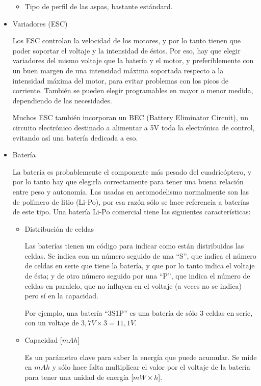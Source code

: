 \documentclass[12pt,twoside]{article}
\begin{document}
\begin{itemize}
\begin{itemize}
			\item  Tipo de perfil de las aspas, bastante estándard.
				
		\end{itemize}
		
		\item Variadores (ESC)
		
		Los ESC controlan la velocidad de los motores, y por lo tanto tienen que poder soportar el voltaje y la intensidad de éstos. Por eso, hay que elegir variadores del mismo voltaje que la batería y el motor, y preferiblemente con un buen margen de una intensidad máxima soportada respecto a la intensidad máxima del motor, para evitar problemas con los picos de corriente. También se pueden elegir programables en mayor o menor medida, dependiendo de las necesidades.
		
		Muchos ESC también incorporan un BEC (Battery Eliminator Circuit), un circuito electrónico destinado a alimentar a 5V toda la electrónica de control, evitando así una batería dedicada a eso.
		
		\item Batería
		
		La batería es probablemente el componente más pesado del cuadricóptero, y por lo tanto hay que elegirla correctamente para tener una buena relación entre peso y autonomía. Las usadas en aeromodelismo normalmente son las de polímero de litio (Li-Po), por esa razón sólo se hace referencia a baterías de este tipo. Una batería Li-Po comercial tiene las siguientes características:
			
		\begin{itemize}
			\item Distribución de celdas
			
			Las baterías tienen un código para indicar como están distribuidas las celdas. Se indica con un número seguido de una ``S'', que indica el número de celdas en serie que tiene la batería, y que por lo tanto indica el voltaje de ésta; y de otro número seguido por una ``P'', que indica el número de celdas en paralelo, que no influyen en el voltaje (a veces no se indica) pero sí en la capacidad.
			
			Por ejemplo, una batería ``3S1P'' es una batería de sólo 3 celdas en serie, con un voltaje de $3,7V\times 3=11,1V$.
			
			\item Capacidad [$mAh$]
			
			Es un parámetro clave para saber la energía que puede acumular. Se mide en $mAh$ y sólo hace falta multiplicar el valor por el voltaje de la batería para tener una unidad de energía [$mW\times h$].
			

\end{itemize}
\end{itemize}
\end{document}
